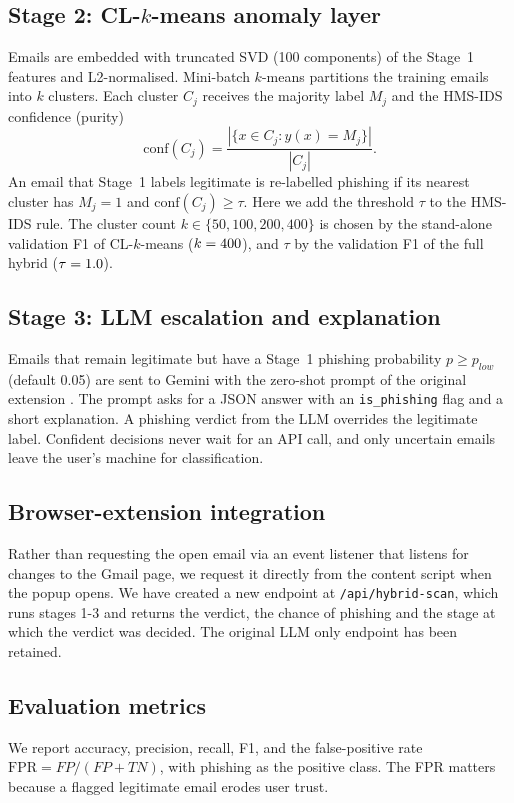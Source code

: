\documentclass[conference]{IEEEtran}
\begin{document}
\subsection{Stage 2: CL-$k$-means anomaly layer}
Emails are embedded with truncated SVD (100 components) of the Stage~1 features and L2-normalised. Mini-batch $k$-means \cite{sculley2010webscale} partitions the training emails into $k$ clusters. Each cluster $C_j$ receives the majority label $M_j$ and the HMS-IDS confidence (purity)
\begin{equation}
\mathrm{conf}(C_j)=\frac{|\{x\in C_j : y(x)=M_j\}|}{|C_j|}.
\end{equation}
An email that Stage~1 labels legitimate is re-labelled phishing if its nearest cluster has $M_j=1$ and $\mathrm{conf}(C_j)\ge\tau$. Here we add the threshold $\tau$ to the HMS-IDS rule. The cluster count $k\in\{50,100,200,400\}$ is chosen by the stand-alone validation F1 of CL-$k$-means ($k=400$), and $\tau$ by the validation F1 of the full hybrid ($\tau=1.0$).

\subsection{Stage 3: LLM escalation and explanation}
Emails that remain legitimate but have a Stage~1 phishing probability $p\ge p_{low}$ (default 0.05) are sent to Gemini \cite{gemini2023} with the zero-shot prompt of the original extension \cite{cmpe209repo}. The prompt asks for a JSON answer with an \texttt{is\_phishing} flag and a short explanation. A phishing verdict from the LLM overrides the legitimate label. Confident decisions never wait for an API call, and only uncertain emails leave the user's machine for classification.

\subsection{Browser-extension integration}\label{sec:ext}
Rather than requesting the open email via an event listener that listens for changes to the Gmail page, we request it directly from the content script when the popup opens. We have created a new endpoint at \texttt{/api/hybrid-scan}, which runs stages 1-3 and returns the verdict, the chance of phishing and the stage at which the verdict was decided. The original LLM only endpoint has been retained.

\subsection{Evaluation metrics}
We report accuracy, precision, recall, F1, and the false-positive rate $\mathrm{FPR}=FP/(FP+TN)$, with phishing as the positive class. The FPR matters because a flagged legitimate email erodes user trust.
\end{document}
